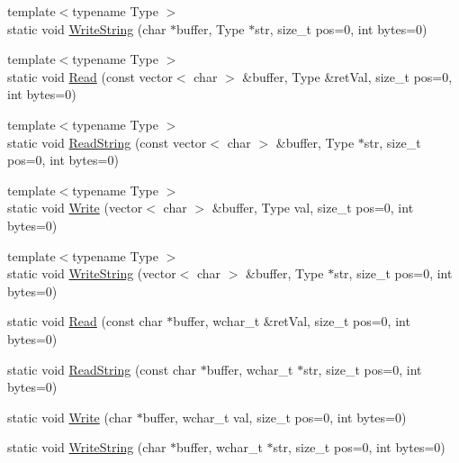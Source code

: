 \begin{DoxyCompactItemize}
\item 
{\footnotesize template$<$typename Type $>$ }\\static void \hyperlink{struct_y_compound_files_1_1_little_endian_a8fe264d85ae6bf400759c42e41aba0e9}{Write\+String} (char $\ast$buffer, Type $\ast$str, size\+\_\+t pos=0, int bytes=0)
\item 
{\footnotesize template$<$typename Type $>$ }\\static void \hyperlink{struct_y_compound_files_1_1_little_endian_a5ff3ff2d62117353c9f387d5d79c209e}{Read} (const vector$<$ char $>$ \&buffer, Type \&ret\+Val, size\+\_\+t pos=0, int bytes=0)
\item 
{\footnotesize template$<$typename Type $>$ }\\static void \hyperlink{struct_y_compound_files_1_1_little_endian_a346a196e2b55c4fa56272db27aba1c0c}{Read\+String} (const vector$<$ char $>$ \&buffer, Type $\ast$str, size\+\_\+t pos=0, int bytes=0)
\item 
{\footnotesize template$<$typename Type $>$ }\\static void \hyperlink{struct_y_compound_files_1_1_little_endian_a634ee9ee9122d1c2765f5e7edec3e316}{Write} (vector$<$ char $>$ \&buffer, Type val, size\+\_\+t pos=0, int bytes=0)
\item 
{\footnotesize template$<$typename Type $>$ }\\static void \hyperlink{struct_y_compound_files_1_1_little_endian_aa36071426512c3c8b9f915a3c464765c}{Write\+String} (vector$<$ char $>$ \&buffer, Type $\ast$str, size\+\_\+t pos=0, int bytes=0)
\item 
static void \hyperlink{struct_y_compound_files_1_1_little_endian_af8bb36347209e695f2583287fd90bd1d}{Read} (const char $\ast$buffer, wchar\+\_\+t \&ret\+Val, size\+\_\+t pos=0, int bytes=0)
\item 
static void \hyperlink{struct_y_compound_files_1_1_little_endian_a0d5fa769f24deb1c0d64b0d2166380b4}{Read\+String} (const char $\ast$buffer, wchar\+\_\+t $\ast$str, size\+\_\+t pos=0, int bytes=0)
\item 
static void \hyperlink{struct_y_compound_files_1_1_little_endian_a5ef0063196ca0fb704011bf7dda670cd}{Write} (char $\ast$buffer, wchar\+\_\+t val, size\+\_\+t pos=0, int bytes=0)
\item 
static void \hyperlink{struct_y_compound_files_1_1_little_endian_a8e1c4f95816e34b7b01acef853677354}{Write\+String} (char $\ast$buffer, wchar\+\_\+t $\ast$str, size\+\_\+t pos=0, int bytes=0)
\item 

\end{DoxyCompactItemize}
